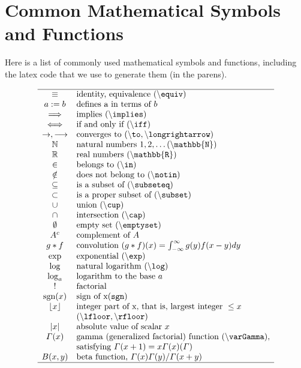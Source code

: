 \documentclass[]{book}
\theoremstyle{definition}
\theoremstyle{definition}
\theoremstyle{definition}
\theoremstyle{remark}
\begin{document}
\section{Common Mathematical Symbols and Functions}\label{S:Symbols}

Here is a list of commonly used mathematical symbols and functions,
including the latex code that we use to generate them (in the parens).

\[
\begin{array}{cl}
\hline
\equiv & \text{identity, equivalence }(\backslash\tt{equiv}) \\
a:=b   & \text{defines a in terms of }b \\
\implies     & \text{implies }(\backslash\tt{implies})\\
\iff  & \text{if and only if }(\backslash\tt{iff})\\
\to, \longrightarrow & \text{converges to }(\backslash\tt{to}, \backslash\tt{longrightarrow}) \\
\mathbb{N} & \text{natural numbers }1,2,\ldots ( \backslash\tt{mathbb\{N\}}) \\
\mathbb{R} & \text{real numbers }(\backslash\tt{mathbb\{R\}})\\
\in        & \text{belongs to }(\backslash\tt{in}) \\
\notin     & \text{does not belong to }(\backslash\tt{notin}) \\
\subseteq  & \text{is a subset of }(\backslash\tt{subseteq}) \\
\subset    & \text{is a proper subset of }(\backslash\tt{subset}) \\
\cup       & \text{union  }(\backslash\tt{cup}) \\
\cap       & \text{intersection  }(\backslash\tt{cap}) \\
\emptyset  & \text{empty set }(\backslash\tt{emptyset})  \\
A^{c}      & \text{complement of }A   \\
g*f        & \text{convolution }(g*f)(x)=\int_{-\infty}^{\infty}g(y)f(x-y)dy \\
\exp       & \text{exponential }(\backslash\tt{exp}) \\
\log       & \text{natural logarithm }(\backslash\tt{log})\\
\log_a     & \text{logarithm to the base }a \\
!          & \text{factorial} \\
\text{sgn}(x)    & \text{sign of x}(\tt{sgn}) \\
\lfloor x\rfloor & \text{integer part of x, that is, largest integer }\leq x \\
                 & (\backslash\tt{lfloor}, \backslash\tt{rfloor}) \\
|x|        & \text{absolute value of scalar }x \\
\varGamma(x) & \text{gamma (generalized factorial) function } (\backslash\tt{varGamma}),\\
           & \text{satisfying }\varGamma(x+1)=x\varGamma(x) (\tt{\varGamma}) \\
B(x,y)     & \text{beta function, }\varGamma(x)\varGamma(y)/\varGamma(x+y) \\
\hline
\end{array}
\]
\end{document}
